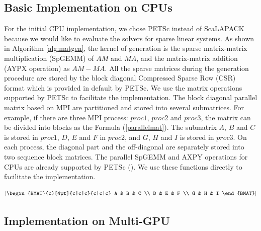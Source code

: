 \subsection{Basic Implementation on CPUs}

For the initial CPU implementation, we chose PETSc instead of ScaLAPACK because we would like to evaluate the solvers for sparse linear systems. As shown in Algorithm \ref{alg:matgen}, the kernel of generation is the sparse matrix-matrix multiplication (SpGEMM) of $AM$ and $MA$, and the matrix-matrix addition (AYPX operation) as $AM-MA$. All the sparse matrices during the generation procedure are stored by the block diagonal Compressed Sparse Row (CSR) format which is provided in default by PETSc. We use the matrix operations supported by PETSc to facilitate the implementation. The block diagonal parallel matrix based on MPI are partitioned and stored into several submatrices. For example, if there are three MPI process: $proc1$, $proc2$ and $proc3$, the matrix can be divided into blocks as the Formula (\ref{parallelmat}). The submatrix $A$, $B$ and $C$ is stored in $proc1$,  $D$, $E$ and $F$ in $proc2$, and $G$, $H$ and $I$ is stored in $proc3$. On each process, the diagonal part and the off-diagonal are separately stored into two sequence block matrices. The parallel SpGEMM and AXPY operations for CPUs are already supported by PETSc (\cite{balay2016petsc}). We use these functions directly to facilitate the implementation.


\begin{equation}
\label{parallelmat}
\left[
\begin{BMAT}(c)[4pt]{c|c|c}{c|c|c}
A  & B & C  \\
D & E & F  \\
G & H & I 
\end{BMAT}
\right]
\end{equation}


\subsection{Implementation on Multi-GPU}

